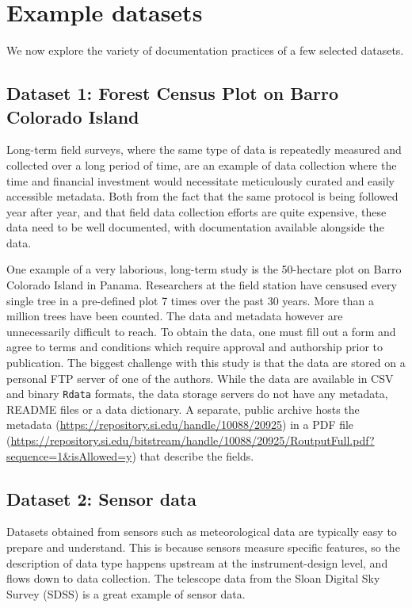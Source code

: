 \documentclass[
]{article}
\begin{document}
\hypertarget{example-data}{%
\section{Example datasets}\label{example-data}}

We now explore the variety of documentation practices of a few selected datasets.

\hypertarget{ex-data-1}{%
\subsection{Dataset 1: Forest Census Plot on Barro Colorado Island}\label{ex-data-1}}

Long-term field surveys, where the same type of data is repeatedly measured and collected over a long period of time, are an example of data collection where the time and financial investment would necessitate meticulously curated and easily accessible metadata. Both from the fact that the same protocol is being followed year after year, and that field data collection efforts are quite expensive, these data need to be well documented, with documentation available alongside the data.

One example of a very laborious, long-term study is the 50-hectare plot on Barro Colorado Island in Panama. Researchers at the field station have censused every single tree in a pre-defined plot 7 times over the past 30 years. More than a million trees have been counted. The data and metadata however are unnecessarily difficult to reach. To obtain the data, one must fill out a form and agree to terms and conditions which require approval and authorship prior to publication. The biggest challenge with this study is that the data are stored on a personal FTP server of one of the authors. While the data are available in CSV and binary \texttt{Rdata} formats, the data storage servers do not have any metadata, README files or a data dictionary. A separate, public archive hosts the metadata (\url{https://repository.si.edu/handle/10088/20925}) in a PDF file (\url{https://repository.si.edu/bitstream/handle/10088/20925/RoutputFull.pdf?sequence=1\&isAllowed=y}) that describe the fields.

\hypertarget{sdss-data}{%
\subsection{Dataset 2: Sensor data}\label{sdss-data}}

Datasets obtained from sensors such as meteorological data are typically easy to prepare and understand. This is because sensors measure specific features, so the description of data type happens upstream at the instrument-design level, and flows down to data collection. The telescope data from the Sloan Digital Sky Survey (SDSS) is a great example of sensor data.
\end{document}
